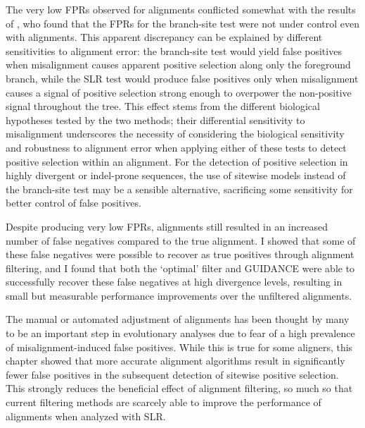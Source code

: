 The very low FPRs observed for \prankc alignments conflicted somewhat
with the results of \citet{Fletcher2010}, who found that the FPRs for
the branch-site test were not under control even with \prankc
alignments. This apparent discrepancy can be explained by different
sensitivities to alignment error: the branch-site test would yield
false positives when misalignment causes apparent positive selection
along only the foreground branch, while the SLR test would produce
false positives only when misalignment causes a signal of positive
selection strong enough to overpower the non-positive signal
throughout the tree. This effect stems from the different biological
hypotheses tested by the two methods; their differential sensitivity
to misalignment underscores the necessity of considering the
biological sensitivity and robustness to alignment error when applying
either of these tests to detect positive selection within an
alignment. For the detection of positive selection in highly divergent
or indel-prone sequences, the use of sitewise models instead of the
branch-site test may be a sensible alternative, sacrificing some
sensitivity for better control of false positives.

Despite producing very low FPRs, \prankc alignments still resulted in
an increased number of false negatives compared to the true
alignment. I showed that some of these false negatives were possible
to recover as true positives through alignment filtering, and I found
that both the `optimal' filter and GUIDANCE were able to successfully
recover these false negatives at high divergence levels, resulting in
small but measurable performance improvements over the unfiltered
\prankc alignments.

The manual or automated adjustment of alignments has been thought by
many to be an important step in evolutionary analyses due to fear of a
high prevalence of misalignment-induced false positives. While this is
true for some aligners, this chapter showed that more accurate
alignment algorithms result in significantly fewer false positives in
the subsequent detection of sitewise positive selection. This strongly
reduces the beneficial effect of alignment filtering, so much so that
current filtering methods are scarcely able to improve the performance
of \prankc alignments when analyzed with SLR.

